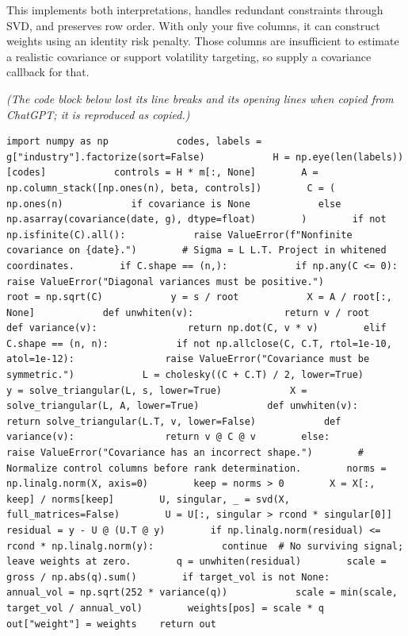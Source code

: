 This implements both interpretations, handles redundant constraints through SVD, and preserves row order. With only your five columns, it can construct weights using an identity risk penalty. Those columns are insufficient to estimate a realistic covariance or support volatility targeting, so supply a covariance callback for that.

\emph{(The code block below lost its line breaks and its opening lines when copied from ChatGPT; it is reproduced as copied.)}

\begin{verbatim}
import numpy as np            codes, labels = g["industry"].factorize(sort=False)            H = np.eye(len(labels))[codes]            controls = H * m[:, None]        A = np.column_stack([np.ones(n), beta, controls])        C = (            np.ones(n)            if covariance is None            else np.asarray(covariance(date, g), dtype=float)        )        if not np.isfinite(C).all():            raise ValueError(f"Nonfinite covariance on {date}.")        # Sigma = L L.T. Project in whitened coordinates.        if C.shape == (n,):            if np.any(C <= 0):                raise ValueError("Diagonal variances must be positive.")            root = np.sqrt(C)            y = s / root            X = A / root[:, None]            def unwhiten(v):                return v / root            def variance(v):                return np.dot(C, v * v)        elif C.shape == (n, n):            if not np.allclose(C, C.T, rtol=1e-10, atol=1e-12):                raise ValueError("Covariance must be symmetric.")            L = cholesky((C + C.T) / 2, lower=True)            y = solve_triangular(L, s, lower=True)            X = solve_triangular(L, A, lower=True)            def unwhiten(v):                return solve_triangular(L.T, v, lower=False)            def variance(v):                return v @ C @ v        else:            raise ValueError("Covariance has an incorrect shape.")        # Normalize control columns before rank determination.        norms = np.linalg.norm(X, axis=0)        keep = norms > 0        X = X[:, keep] / norms[keep]        U, singular, _ = svd(X, full_matrices=False)        U = U[:, singular > rcond * singular[0]]        residual = y - U @ (U.T @ y)        if np.linalg.norm(residual) <= rcond * np.linalg.norm(y):            continue  # No surviving signal; leave weights at zero.        q = unwhiten(residual)        scale = gross / np.abs(q).sum()        if target_vol is not None:            annual_vol = np.sqrt(252 * variance(q))            scale = min(scale, target_vol / annual_vol)        weights[pos] = scale * q    out["weight"] = weights    return out
\end{verbatim}

